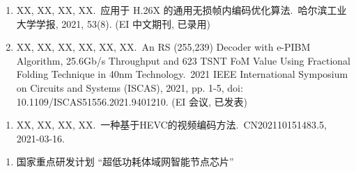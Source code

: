 \begin{publications}
    \begin{enumerate}
        \item XX, XX, XX, XX.\,
              应用于 H.26X 的通用无损帧内编码优化算法.\,
              哈尔滨工业大学学报, 2021, 53(8). (EI 中文期刊, 已录用)

        \item XX, XX, XX, XX, XX, XX.\,
              An RS (255,239) Decoder with e-PIBM Algorithm, 25.6Gb/s Throughput and 623 TSNT FoM Value Using Fractional Folding Technique in 40nm Technology.\,
              2021 IEEE International Symposium on Circuits and Systems (ISCAS), 2021, pp. 1-5, doi: 10.1109/ISCAS51556.2021.9401210. (EI 会议, 已发表)
    \end{enumerate}

    \begin{enumerate}
        \item XX, XX, XX, XX.\,
              一种基于HEVC的视频编码方法.\,
              CN202110151483.5, 2021-03-16.
    \end{enumerate}

    \begin{enumerate}
        \item 国家重点研发计划 “超低功耗体域网智能节点芯片”
    \end{enumerate}
\end{publications}